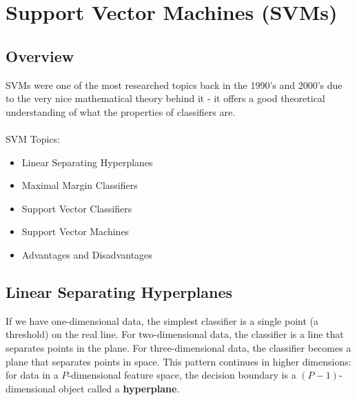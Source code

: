 \documentclass{article}
\begin{document}
\section{Support Vector Machines (SVMs)}
\subsection{Overview}
SVMs were one of the most researched topics back in the 1990's and 2000's due to the very nice mathematical theory behind it - it offers a good theoretical understanding of what the properties of classifiers are.\\~\\
SVM Topics:
\begin{itemize}
\item Linear Separating Hyperplanes
\item Maximal Margin Classifiers
\item Support Vector Classifiers
\item Support Vector Machines
\item Advantages and Disadvantages
\end{itemize}
\subsection{Linear Separating Hyperplanes}
If we have one-dimensional data, the simplest classifier is a single point (a threshold) on the real line. For two-dimensional data, the classifier is a line that separates points in the plane. For three-dimensional data, the classifier becomes a plane that separates points in space. This pattern continues in higher dimensions: for data in a 
$P$-dimensional feature space, the decision boundary is a $(P-1)$-dimensional object called a \textbf{hyperplane}.
\end{document}
